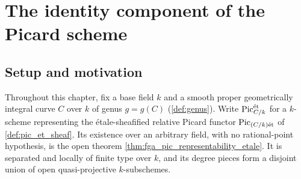 \chapter{The identity component of the Picard scheme}
\label{chap:Picard_IdentityComponent}
\providecommand{\connComp}{\operatorname{Comp}}

%


\section{Setup and motivation}
\label{sec:pic0_setup}

Throughout this chapter, fix a base field \(k\) and a smooth proper
geometrically integral curve \(C\) over \(k\) of genus \(g = g(C)\)
(\cref{def:genus}). Write \(\operatorname{Pic}^{\mathrm{\acute{e}t}}_{C/k}\) for a \(k\)-scheme
representing the \'etale-sheafified relative Picard functor
\(\operatorname{Pic}_{(C/k)\mathrm{\acute{e}t}}\) of \cref{def:pic_et_sheaf}. Its existence over an
arbitrary field, with no rational-point hypothesis, is the open theorem
\cref{thm:fga_pic_representability_etale}. It is separated and locally of
finite type over \(k\), and its degree pieces form a disjoint union of open
quasi-projective \(k\)-subschemes.

